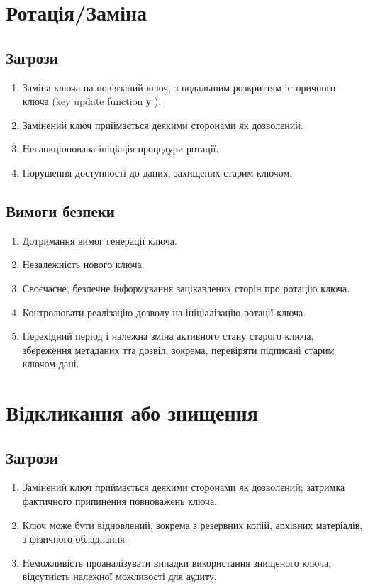 \documentclass{kpi-lab}
\begin{document}
\section{Ротація/Заміна}
\subsection{Загрози}
\begin{enumerate}
  \item
    Заміна ключа на пов'язаний ключ, з подальшим
    розкриттям історичного ключа
    (key update function у \cite{Barker2020a}).
  \item
    Замінений ключ приймається деякими сторонами як дозволений.
  \item
    Несанкціонована ініціація процедури ротації.
  \item
    Порушення доступності до даних, захищених старим ключом.
\end{enumerate}
\subsection{Вимоги безпеки}
\begin{enumerate}
  \item
    Дотримання вимог генерації ключа.
  \item
    Незалежність нового ключа.
  \item
    Своєчасне, безпечне інформування зацікавлених
    сторін про ротацію ключа.
  \item
    Контролювати реалізацію дозволу на ініціалізацію ротації ключа.
  \item Перехідний період і належна зміна активного стану
    старого ключа, збереження метаданих тта дозвіл,
    зокрема, перевіряти підписані старим ключом дані.
\end{enumerate}

\section{Відкликання або знищення}
\subsection{Загрози}
\begin{enumerate}
  \item
    Замінений ключ приймається деякими сторонами як дозволений;
    затримка фактичного припинення повноважень ключа.
  \item
    Ключ може бути відновлений, зокрема з резервних
    копій, архівних матеріалів, з фізичного обладнання.
  \item
    Неможливість проаналізувати випадки використання
    знищеного ключа, відсутність належної можливості для аудиту.
\end{enumerate}
\end{document}
